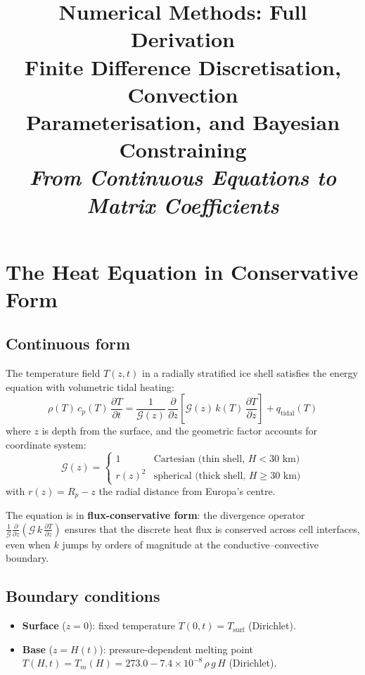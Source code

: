 \documentclass[11pt,a4paper]{article}
\title{\textbf{Numerical Methods: Full Derivation}\\[0.3em]
\Large Finite Difference Discretisation, Convection\\
Parameterisation, and Bayesian Constraining\\[0.5em]
\large\textit{From Continuous Equations to Matrix Coefficients}}
\author{}
\date{}
\newcommand{\pp}{\partial}
\begin{document}
\maketitle
\thispagestyle{fancy}
\tableofcontents
\newpage

\section{The Heat Equation in Conservative Form}
\label{sec:governing}

\subsection{Continuous form}

The temperature field $T(z,t)$ in a radially stratified ice shell
satisfies the energy equation with volumetric tidal heating:
\begin{equation}
\rho(T)\,c_p(T)\,\frac{\pp T}{\pp t}
  = \frac{1}{\mathcal{G}(z)}\,\frac{\pp}{\pp z}
    \left[\mathcal{G}(z)\,k(T)\,\frac{\pp T}{\pp z}\right]
  + q_{\mathrm{tidal}}(T)
\label{eq:heat}
\end{equation}
where $z$ is depth from the surface, and the geometric factor accounts
for coordinate system:
\begin{equation}
\mathcal{G}(z) = \begin{cases}
  1       & \text{Cartesian (thin shell, } H < 30\text{~km)} \\
  r(z)^2  & \text{spherical (thick shell, } H \geq 30\text{~km)}
\end{cases}
\end{equation}
with $r(z) = R_p - z$ the radial distance from Europa's centre.

The equation is in \textbf{flux-conservative form}: the divergence
operator $\frac{1}{\mathcal{G}}\frac{\pp}{\pp z}(\mathcal{G}\,k\,\frac{\pp T}{\pp z})$
ensures that the discrete heat flux is conserved across cell interfaces,
even when $k$ jumps by orders of magnitude at the conductive--convective
boundary.

\subsection{Boundary conditions}

\begin{itemize}[leftmargin=2em]
\item \textbf{Surface} ($z = 0$): fixed temperature $T(0,t) = T_{\mathrm{surf}}$
      (Dirichlet).
\item \textbf{Base} ($z = H(t)$): pressure-dependent melting point
      $T(H,t) = T_m(H) = 273.0 - 7.4\times10^{-8}\,\rho\,g\,H$ (Dirichlet).
\end{itemize}
\end{document}
